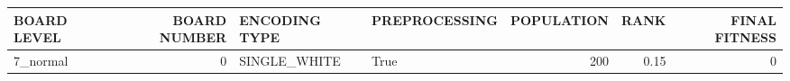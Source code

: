 \begin{tabular}{lrllrrr}
\hline
 BOARD LEVEL   &   BOARD NUMBER & ENCODING TYPE   & PREPROCESSING   &   POPULATION &   RANK &   FINAL FITNESS \\
\hline
 7\_normal      &              0 & SINGLE\_WHITE    & True            &          200 &   0.15 &               0 \\
\hline
\end{tabular}